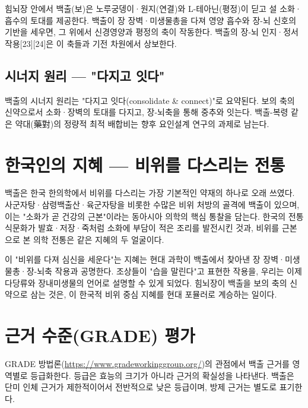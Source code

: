\documentclass[12pt,oneside]{book}
\begin{document}
힘뇌장 안에서 백출(보)은 노루궁뎅이·원지(연결)와 L-테아닌(평정)이 딛고 설 소화·흡수의 토대를 제공한다. 백출이 장 장벽·미생물총을 다져 영양 흡수와 장-뇌 신호의 기반을 세우면, 그 위에서 신경영양과 평정의 축이 작동한다. 백출의 장-뇌 인지·정서 작용[23][24]은 이 축들과 기전 차원에서 상보한다.

\subsection{시너지 원리 — "다지고 잇다"}

백출의 시너지 원리는 "다지고 잇다(consolidate \& connect)"로 요약된다. 보의 축의 신약으로서 소화·장벽의 토대를 다지고, 장-뇌축을 통해 중추와 잇는다. 백출-복령 같은 약대(藥對)의 정량적 최적 배합비는 향후 요인설계 연구의 과제로 남는다.

\section{한국인의 지혜 — 비위를 다스리는 전통}

백출은 한국 한의학에서 비위를 다스리는 가장 기본적인 약재의 하나로 오래 쓰였다. 사군자탕·삼령백출산·육군자탕을 비롯한 수많은 비위 처방의 골격에 백출이 있으며, 이는 "소화가 곧 건강의 근본"이라는 동아시아 의학의 핵심 통찰을 담는다. 한국의 전통 식문화가 발효·저장·죽처럼 소화에 부담이 적은 조리를 발전시킨 것과, 비위를 근본으로 본 의학 전통은 같은 지혜의 두 얼굴이다.

이 "비위를 다져 심신을 세운다"는 지혜는 현대 과학이 백출에서 찾아낸 장 장벽·미생물총·장-뇌축 작용과 공명한다. 조상들이 "습을 말린다"고 표현한 작용을, 우리는 이제 다당류와 장내미생물의 언어로 설명할 수 있게 되었다. 힘뇌장이 백출을 보의 축의 신약으로 삼는 것은, 이 한국적 비위 중심 지혜를 현대 포뮬러로 계승하는 일이다.

\section{근거 수준(GRADE) 평가}

GRADE 방법론(\url{https://www.gradeworkinggroup.org/})의 관점에서 백출 근거를 영역별로 등급화한다. 등급은 효능의 크기가 아니라 근거의 확실성을 나타낸다. 백출은 단미 인체 근거가 제한적이어서 전반적으로 낮은 등급이며, 방제 근거는 별도로 표기한다.
\end{document}

